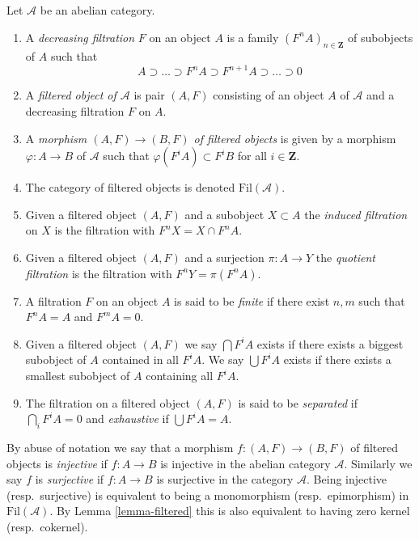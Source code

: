 \begin{definition}
\label{definition-filtered}
Let $\mathcal{A}$ be an abelian category.
\begin{enumerate}
\item A {\it decreasing filtration} $F$ on an object $A$
is a family $(F^nA)_{n \in \mathbf{Z}}$ of subobjects of $A$ such that
$$
A \supset \ldots \supset F^nA \supset F^{n + 1}A \supset \ldots \supset 0
$$
\item A {\it filtered object of $\mathcal{A}$} is
pair $(A, F)$ consisting of an object $A$ of $\mathcal{A}$
and a decreasing filtration $F$ on $A$.
\item A {\it morphism $(A, F) \to (B, F)$ of filtered objects}
is given by a morphism $\varphi : A \to B$ of $\mathcal{A}$
such that $\varphi(F^iA) \subset F^iB$ for all $i \in \mathbf{Z}$.
\item The category of filtered objects is denoted $\text{Fil}(\mathcal{A})$.
\item Given a filtered object $(A, F)$ and a subobject $X \subset A$ the
{\it induced filtration} on $X$ is the filtration with $F^nX = X \cap F^nA$.
\item Given a filtered object $(A, F)$ and a surjection
$\pi : A \to Y$ the {\it quotient filtration} is the filtration with
$F^nY = \pi(F^nA)$.
\item A filtration $F$ on an object $A$ is said to be {\it finite}
if there exist $n, m$ such that $F^nA = A$ and $F^mA = 0$.
\item Given a filtered object $(A, F)$ we say $\bigcap F^iA$ exists
if there exists a biggest subobject of $A$ contained in all $F^iA$.
We say $\bigcup F^iA$ exists if there exists a smallest subobject
of $A$ containing all $F^iA$.
\item The filtration on a filtered object $(A, F)$ is said to be
{\it separated} if $\bigcap_i F^iA = 0$ and
{\it exhaustive} if $\bigcup F^iA = A$.
\end{enumerate}
\end{definition}

\noindent
By abuse of notation we say that a morphism $f : (A, F) \to (B, F)$
of filtered objects is {\it injective} if $f : A \to B$ is injective
in the abelian category $\mathcal{A}$. Similarly we say $f$ is
{\it surjective} if $f : A \to B$ is surjective in the category
$\mathcal{A}$. Being injective (resp.\ surjective)
is equivalent to being a monomorphism (resp.\ epimorphism)
in $\text{Fil}(\mathcal{A})$. By
Lemma \ref{lemma-filtered}
this is also equivalent to having zero kernel (resp.\ cokernel).

